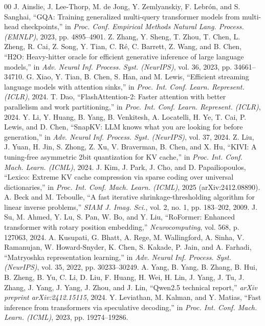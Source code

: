 \documentclass[conference]{IEEEtran}
\begin{document}
\begin{thebibliography}{00}
 J. Ainslie, J. Lee-Thorp, M. de Jong, Y. Zemlyanskiy, F. Lebr\'{o}n, and S. Sanghai, ``GQA: Training generalized multi-query transformer models from multi-head checkpoints,'' in \textit{Proc. Conf. Empirical Methods Natural Lang. Process. (EMNLP)}, 2023, pp. 4895--4901.
 Z. Zhang, Y. Sheng, T. Zhou, T. Chen, L. Zheng, R. Cai, Z. Song, Y. Tian, C. R\'{e}, C. Barrett, Z. Wang, and B. Chen, ``H2O: Heavy-hitter oracle for efficient generative inference of large language models,'' in \textit{Adv. Neural Inf. Process. Syst. (NeurIPS)}, vol. 36, 2023, pp. 34661--34710.
 G. Xiao, Y. Tian, B. Chen, S. Han, and M. Lewis, ``Efficient streaming language models with attention sinks,'' in \textit{Proc. Int. Conf. Learn. Represent. (ICLR)}, 2024.
 T. Dao, ``FlashAttention-2: Faster attention with better parallelism and work partitioning,'' in \textit{Proc. Int. Conf. Learn. Represent. (ICLR)}, 2024.
 Y. Li, Y. Huang, B. Yang, B. Venkitesh, A. Locatelli, H. Ye, T. Cai, P. Lewis, and D. Chen, ``SnapKV: LLM knows what you are looking for before generation,'' in \textit{Adv. Neural Inf. Process. Syst. (NeurIPS)}, vol. 37, 2024.
 Z. Liu, J. Yuan, H. Jin, S. Zhong, Z. Xu, V. Braverman, B. Chen, and X. Hu, ``KIVI: A tuning-free asymmetric 2bit quantization for KV cache,'' in \textit{Proc. Int. Conf. Mach. Learn. (ICML)}, 2024.
 J. Kim, J. Park, J. Cho, and D. Papailiopoulos, ``Lexico: Extreme KV cache compression via sparse coding over universal dictionaries,'' in \textit{Proc. Int. Conf. Mach. Learn. (ICML)}, 2025 (arXiv:2412.08890).
 A. Beck and M. Teboulle, ``A fast iterative shrinkage-thresholding algorithm for linear inverse problems,'' \textit{SIAM J. Imag. Sci.}, vol. 2, no. 1, pp. 183--202, 2009.
 J. Su, M. Ahmed, Y. Lu, S. Pan, W. Bo, and Y. Liu, ``RoFormer: Enhanced transformer with rotary position embedding,'' \textit{Neurocomputing}, vol. 568, p. 127063, 2024.
 A. Kusupati, G. Bhatt, A. Rege, M. Wallingford, A. Sinha, V. Ramanujan, W. Howard-Snyder, K. Chen, S. Kakade, P. Jain, and A. Farhadi, ``Matryoshka representation learning,'' in \textit{Adv. Neural Inf. Process. Syst. (NeurIPS)}, vol. 35, 2022, pp. 30233--30249.
 A. Yang, B. Yang, B. Zhang, B. Hui, B. Zheng, B. Yu, C. Li, D. Liu, F. Huang, H. Wei, H. Lin, J. Yang, J. Tu, J. Zhang, J. Yang, J. Yang, J. Zhou, and J. Lin, ``Qwen2.5 technical report,'' \textit{arXiv preprint arXiv:2412.15115}, 2024.
 Y. Leviathan, M. Kalman, and Y. Matias, ``Fast inference from transformers via speculative decoding,'' in \textit{Proc. Int. Conf. Mach. Learn. (ICML)}, 2023, pp. 19274--19286.

\end{thebibliography}
\end{document}
